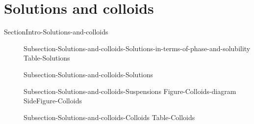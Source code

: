 \documentclass[main.tex]{subfiles}
\newcommand\chapterlabel{Ch-solutions}\setcounter{figurenewcounter}{0}\setcounter{tablenewcounter}{0}\setcounter{formulanewcounter}{0}
\begin{document}
\section{Solutions and colloids}{SectionIntro-Solutions-and-colloids}
\sloppy \begin{description}
\item[] {Subsection-Solutions-and-colloids-Solutions-in-terms-of-phase-and-solubility}
{Table-Solutions}
\item[] {Subsection-Solutions-and-colloids-Solutions}
\item[] 
{Subsection-Solutions-and-colloids-Suspensions}
{Figure-Colloids-diagram}
{SideFigure-Colloids}
\item[] {Subsection-Solutions-and-colloids-Colloids}
{Table-Colloids}
\end{description}
\end{document}

